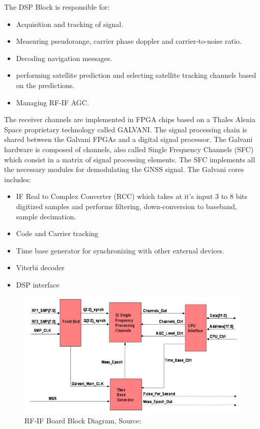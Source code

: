 The DSP Block is responsible for\cite{ref_station_receiver}:
\begin{itemize}
    \item Acquisition and tracking of signal.
    \item Measuring pseudorange, carrier phase doppler and carrier-to-noise ratio.
    \item Decoding navigation messages.
    \item performing satellite prediction and selecting satellite tracking channels based on the predictions.
    \item Managing RF-IF AGC.
\end{itemize}

The receiver channels are implemented in FPGA chips based on a Thales Alenia Space proprietary technology called GALVANI\cite{ref_station_receiver}. The signal processing chain is shared between the Galvani FPGAs and a digital signal processor. The Galvani hardware is composed of channels, also called Single Frequency Channels (SFC)\cite{ref_station_receiver} which consist in a matrix of signal processing elements. The SFC implements all the necessary modules for demodulating the GNSS signal. The Galvani cores includes\cite{ref_station_receiver}:

\begin{itemize}
    \item IF Real to Complex Converter (RCC) which takes at it's input 3 to 8 bits digitized samples and performs filtering, down-conversion to baseband, sample decimation.
    \item Code and Carrier tracking
    \item Time base generator for synchronizing with other external devices.
    \item Viterbi decoder
    \item DSP interface
\end{itemize}

\begin{figure}[h]
\centering
\includegraphics[width=\textwidth]{img/galvani_core}
\caption{RF-IF Board Block Diagram, Source:\cite{ref_station_receiver}}
\label{fig:galvani_core}
\end{figure}

